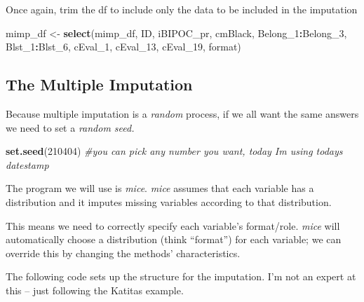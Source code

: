 \documentclass[
  11pt,
]{book}
\newenvironment{Shaded}{\begin{snugshade}}{\end{snugshade}}
\newcommand{\AttributeTok}[1]{\textcolor[rgb]{0.27,0.27,0.27}{#1}}
\newcommand{\CommentTok}[1]{\textcolor[rgb]{0.37,0.37,0.37}{\textit{#1}}}
\newcommand{\DecValTok}[1]{\textcolor[rgb]{0.06,0.06,0.06}{#1}}
\newcommand{\FunctionTok}[1]{\textcolor[rgb]{0.27,0.27,0.27}{\textbf{#1}}}
\newcommand{\NormalTok}[1]{#1}
\newcommand{\OtherTok}[1]{\textcolor[rgb]{0.37,0.37,0.37}{#1}}
\newcommand{\SpecialCharTok}[1]{\textcolor[rgb]{0.43,0.43,0.43}{\textbf{#1}}}
\begin{document}
Once again, trim the df to include only the data to be included in the imputation

\begin{Shaded}
\begin{Highlighting}[]
\NormalTok{mimp\_df }\OtherTok{\textless{}{-}} \FunctionTok{select}\NormalTok{(mimp\_df, ID, iBIPOC\_pr, cmBlack, Belong\_1}\SpecialCharTok{:}\NormalTok{Belong\_3, Blst\_1}\SpecialCharTok{:}\NormalTok{Blst\_6,}
\NormalTok{    cEval\_1, cEval\_13, cEval\_19, format)}
\end{Highlighting}
\end{Shaded}

\hypertarget{the-multiple-imputation}{%
\subsection{The Multiple Imputation}\label{the-multiple-imputation}}

Because multiple imputation is a \emph{random} process, if we all want the same answers we need to set a \emph{random seed.}

\begin{Shaded}
\begin{Highlighting}[]
\FunctionTok{set.seed}\NormalTok{(}\DecValTok{210404}\NormalTok{)  }\CommentTok{\#you can pick any number you want, today I\textquotesingle{}m using today\textquotesingle{}s datestamp}
\end{Highlighting}
\end{Shaded}

The program we will use is \emph{mice}. \emph{mice} assumes that each variable has a distribution and it imputes missing variables according to that distribution.

This means we need to correctly specify each variable's format/role. \emph{mice} will automatically choose a distribution (think ``format'') for each variable; we can override this by changing the methods' characteristics.

The following code sets up the structure for the imputation. I'm not an expert at this -- just following the Katitas example.

\begin{Shaded}
\end{Shaded}
\end{document}
